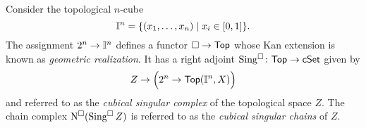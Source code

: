 Consider the topological $n$-cube
\begin{equation*}
\mathbb{I}^{n} = \{(x_1, \dots, x_n) \mid x_i \in [0,1]\}.
\end{equation*}
The assignment $2^n \to \mathbb{I}^n$ defines a functor $\square \to \mathsf{Top}$ whose Kan extension is known as \textit{geometric realization}.
It has a right adjoint $\operatorname{Sing^{\square}} \colon \mathsf{Top} \to \mathsf{cSet}$ given by
\begin{equation*}
Z \to \Big(2^n \to \mathsf{Top}(\mathbb{I}^n, X)\Big)
\end{equation*}
and referred to as the \textit{cubical singular complex} of the topological space $Z$.
The chain complex $\operatorname{N^{\square}}(\operatorname{Sing^{\square}} Z)$ is referred to as the \textit{cubical singular chains} of $Z$.



